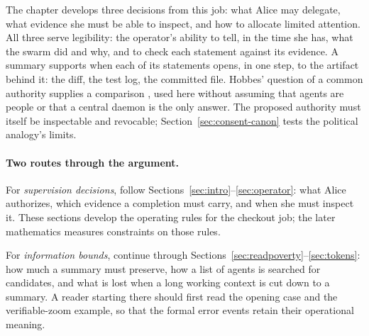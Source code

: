 \documentclass[11pt,a4paper]{article}
\theoremstyle{definition}
\theoremstyle{plain}
\begin{document}
The chapter develops three decisions from this job: what Alice may delegate,
what evidence she must be able to inspect, and how to allocate limited attention.
All three serve legibility: the operator's ability to tell, in the
time she has, what the swarm did and why, and to check each statement against
its evidence. A summary supports  when each of its statements
opens, in one step, to the artifact behind it: the diff, the test log, the
committed file.
Hobbes' question of a common authority supplies a comparison
, used here without assuming that agents are people or that
a central daemon is the only answer. The proposed
authority must itself be inspectable and revocable;
Section~\ref{sec:consent-canon} tests the political analogy's limits.

\paragraph{Two routes through the argument.}
For \emph{supervision decisions}, follow Sections~\ref{sec:intro}--\ref{sec:operator}:
what Alice authorizes, which evidence a completion must carry, and when she
must inspect it. These sections develop the operating rules for the checkout
job; the later mathematics measures constraints on those rules.

For \emph{information bounds}, continue through
Sections~\ref{sec:readpoverty}--\ref{sec:tokens}: how much a summary must preserve,
how a list of agents is searched for candidates, and what is lost when a long
working context is cut down to a summary. A reader
starting there should first read the opening case and the verifiable-zoom
example, so that the formal error events retain their operational meaning.
\end{document}
